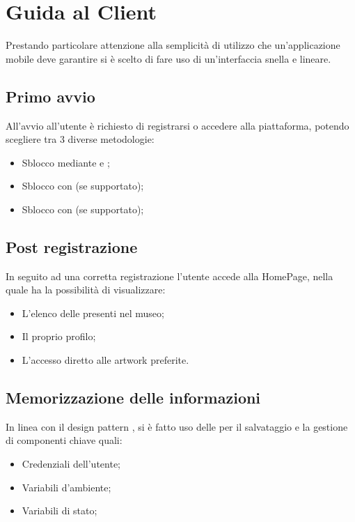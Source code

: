     \newpage
  \section{Guida al Client}
    Prestando particolare attenzione alla semplicità di utilizzo che un'applicazione mobile deve garantire si è scelto di fare uso di un’interfaccia snella e lineare.
    \subsection{Primo avvio}
      All'avvio all'utente è richiesto di registrarsi o accedere alla piattaforma, potendo scegliere tra 3 diverse metodologie:
      \begin{itemize}
        \item Sblocco mediante  e ;
        \item Sblocco con  (se supportato);
        \item Sblocco con  (se supportato);
      \end{itemize}
    \subsection{Post registrazione}
      In seguito ad una corretta registrazione l'utente accede alla HomePage, nella quale ha la possibilità di visualizzare:
      \begin{itemize}
        \item L'elenco delle  presenti nel museo;
        \item Il proprio profilo;
        \item L'accesso diretto alle artwork preferite.
      \end{itemize}
    \subsection{Memorizzazione delle informazioni}
    In linea con il design pattern  \footnotemark {}, si è fatto uso delle \href{https://developer.android.com/reference/android/content/SharedPreferences}{} per il salvataggio e la gestione di componenti chiave quali:
      \begin{itemize}
        \item Credenziali dell'utente;
        \item Variabili d'ambiente;
        \item Variabili di stato;
      \end{itemize}
    
